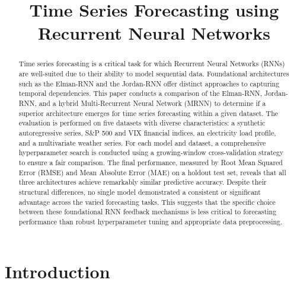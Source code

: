 \documentclass[conference, 10pt]{IEEEtran}
\begin{document}
\title{Time Series Forecasting using Recurrent Neural Networks}

\author{
}

\maketitle

\begin{abstract}
    Time series forecasting is a critical task for which Recurrent Neural Networks (RNNs) are well-suited due to their
    ability to model sequential data. Foundational architectures such as the Elman-RNN and the Jordan-RNN offer distinct
    approaches to capturing temporal dependencies. This paper conducts a comparison of the Elman-RNN, Jordan-RNN, and a
    hybrid Multi-Recurrent Neural Network (MRNN) to determine if a superior architecture emerges for time series
    forecasting within a given dataset. The evaluation is performed on five datasets with diverse characteristics: a
    synthetic autoregressive series, S\&P 500 and VIX financial indices, an electricity load profile, and a multivariate
    weather series. For each model and dataset, a comprehensive hyperparameter search is conducted using a
    growing-window cross-validation strategy to ensure a fair comparison. The final performance, measured by Root Mean
    Squared Error (RMSE) and Mean Absolute Error (MAE) on a holdout test set, reveals that all three architectures
    achieve remarkably similar predictive accuracy. Despite their structural differences, no single model demonstrated a
    consistent or significant advantage across the varied forecasting tasks. This suggests that the specific choice
    between these foundational RNN feedback mechanisms is less critical to forecasting performance than robust
    hyperparameter tuning and appropriate data preprocessing.
\end{abstract}



\section{Introduction}
\end{document}
